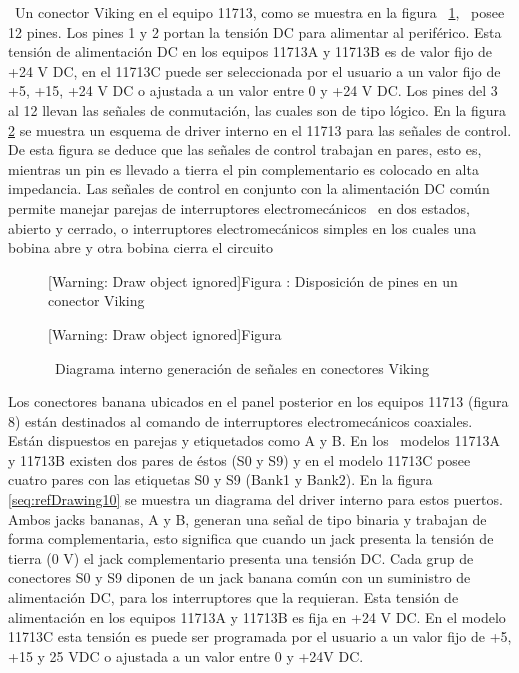 \documentclass[paper=letter,oneside,fontsize=10pt,parskip=full]{article}
\newcounter{Drawing}
\renewcommand\theDrawing{\arabic{Drawing}}
\begin{document}
\ Un conector Viking en el equipo 11713, como se muestra en la figura \ \ref{seq:refDrawing8}, \ posee 12 pines. Los
pines 1 y 2 portan la tensión DC para alimentar al periférico. Esta tensión de alimentación DC en los equipos 11713A y
11713B es de valor fijo de +24 V DC, en el 11713C puede ser seleccionada por el usuario a un valor fijo de +5, +15, +24
V DC o ajustada a un valor entre 0 y +24 V DC. Los pines del 3 al 12 llevan las señales de conmutación, las cuales son
de tipo lógico. En la figura \ref{seq:refDrawing9} se muestra un esquema de driver interno en el 11713 para las señales
de control. De esta figura se deduce que las señales de control trabajan en pares, esto es, mientras un pin es llevado
a tierra el pin complementario es colocado en alta impedancia. Las señales de control en conjunto con la alimentación
DC común permite manejar parejas de interruptores electromecánicos \ en dos estados, abierto y cerrado, o interruptores
electromecánicos simples en los cuales una bobina abre y otra bobina cierra el circuito



\begin{figure}
\centering
\begin{minipage}{17.268cm}
[Warning: Draw object ignored]Figura {\theDrawing\label{seq:refDrawing8}}: Disposición de pines
en un conector Viking
\end{minipage}
\end{figure}


\begin{figure}
\centering
\begin{minipage}{17.214cm}
[Warning: Draw object ignored]Figura {\theDrawing\label{seq:refDrawing9}}

\ Diagrama interno generación de señales en conectores Viking
\end{minipage}
\end{figure}
Los conectores banana ubicados en el panel posterior en los equipos 11713 (figura 8) están destinados al comando de
interruptores electromecánicos coaxiales. Están dispuestos en parejas y etiquetados como A y B. En los \ modelos 11713A
y 11713B existen dos pares de éstos (S0 y S9) y en el modelo 11713C posee cuatro pares con las etiquetas S0 y S9 (Bank1
y Bank2). En la figura \ref{seq:refDrawing10} se muestra un diagrama del driver interno para estos puertos. Ambos jacks
bananas, A y B, generan una señal de tipo binaria y trabajan de forma complementaria, esto significa que cuando un jack
presenta la tensión de tierra (0 V) el jack complementario presenta una tensión DC. Cada grup de conectores S0 y S9
diponen de un jack banana común con un suministro de alimentación DC, para los interruptores que la requieran. Esta
tensión de alimentación en los equipos 11713A y 11713B es fija en +24 V DC. En el modelo 11713C esta tensión es puede
ser programada por el usuario a un valor fijo de +5, +15 y 25 VDC o ajustada a un valor entre 0 y +24V DC.
\end{document}

